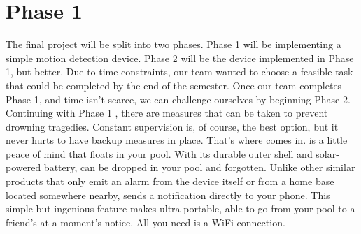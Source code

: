 \section{Phase 1}
The final project will be split into two phases. Phase 1 will be implementing a simple motion detection device. Phase 2 will be the device implemented in Phase 1, but better. Due to time constraints, our team wanted to choose a feasible task that could be completed by the end of the semester. Once our team completes Phase 1, and time isn't scarce, we can challenge ourselves by beginning Phase 2. Continuing with Phase 1 , there are measures that can be taken to prevent drowning tragedies. Constant supervision is, of course, the best option, but it never hurts to have backup measures in place. That’s where \juicy comes in. \juicy is a little peace of mind that floats in your pool. With its durable outer shell and solar-powered battery, \juicy can be dropped in your pool and forgotten. Unlike other similar products that only emit an alarm from the device itself or from a home base located somewhere nearby, \juicy sends a notification directly to your phone. This simple but ingenious feature makes \juicy ultra-portable, able to go from your pool to a friend’s at a moment’s notice. All you need is a WiFi connection.